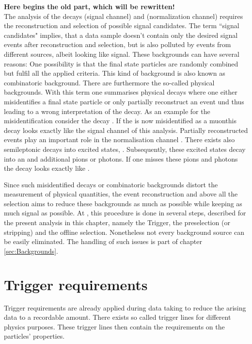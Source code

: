 \textbf{Here begins the old part, which will be rewritten!} \\

The analysis of the decays \LbToDpmunuX (signal channel)  and \LbToLcmunu (normalization channel) requires the reconstruction and selection of possible signal candidates.
The term ``signal candidates" implies, that a data sample doesn't contain only the desired signal events after reconstruction and selection, but is also polluted by events from different sources, albeit looking like signal.
These backgrounds can have several reasons: 
One possibility is that the final state particles are randomly combined but fulfil all the applied criteria. 
This kind of background is also known as combinatoric background.
There are furthermore the so-called physical backgrounds.
With this term one summarises physical decays where one either misidentifies a final state particle or only partially reconstruct an event und thus leading to a wrong interpretation of the decay.
As an example for the misidentification consider the decay \decay{\Lb}{\Dz\proton\pim}. If the \pim is now misidentified as a muonthis decay looks exactly like the signal channel of this analysis.
Partially reconstructed events play an important role in the normalisation channel \LbToLcmunu.
There exists also semileptonic \Lb decays into excited \Lcstar states, \decay{\Lb}{\Lcstar\mun\neumb}.
Subsequently, these excited \Lcstar states decay into an \Lc and additional pions or photons.
If one misses these pions and photons the decay looks exactly like \LbToLcmunu.

Since such misidentified decays or combinatoric backgrounds distort the measurement of physical quantities, the event reconstruction and above all the selection aims to reduce these backgrounds as much as possible while keeping as much signal as possible.
At \lhcb, this procedure is done in several steps, described for the present analysis in this chapter, namely the Trigger, the preselection (or stripping) and the offline selection. 
Nonetheless not every background source can be easily eliminated. 
The handling of such issues is part of chapter \ref{sec:Backgrounds}.

\section{Trigger requirements}
Trigger requirements are already applied during data taking to reduce the arising data to a recordable amount.
There exists so called trigger lines for different physics purposes. 
These trigger lines then contain the requirements on the particles' properties.

